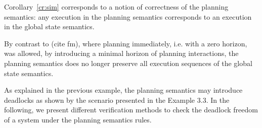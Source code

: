 Corollary~\ref{cr:sim} corresponds to a notion of correctness of the planning semantics: any execution in the planning semantics corresponds to an execution in the global state semantics.

By contrast to (cite fm), where planning immediately, i.e. with a zero horizon, was allowed, 
by introducing a minimal horizon of planning interactions, the planning semantics does no longer
preserve all execution sequences of the global state semantics.

As explained in the previous example, the planning semantics may introduce deadlocks as shown by the scenario presented in the Example 3.3.
In the following, we present different verification methods to check the deadlock freedom of a system under the planning semantics rules.





